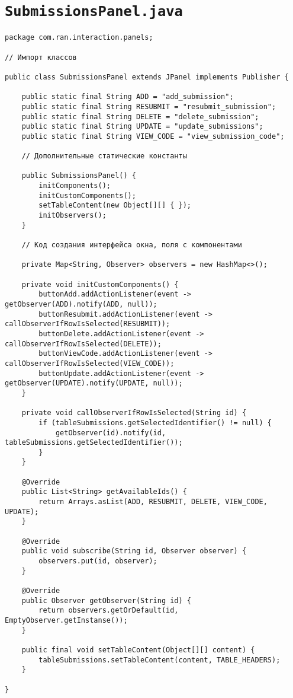 \section*{\texttt{SubmissionsPanel.java}}
\begin{verbatim}
package com.ran.interaction.panels;

// Импорт классов

public class SubmissionsPanel extends JPanel implements Publisher {

    public static final String ADD = "add_submission";
    public static final String RESUBMIT = "resubmit_submission";
    public static final String DELETE = "delete_submission";
    public static final String UPDATE = "update_submissions";
    public static final String VIEW_CODE = "view_submission_code";
    
    // Дополнительные статические константы
    
    public SubmissionsPanel() {
        initComponents();
        initCustomComponents();
        setTableContent(new Object[][] { });
        initObservers();
    }

    // Код создания интерфейса окна, поля с компонентами                     

    private Map<String, Observer> observers = new HashMap<>();
    
    private void initCustomComponents() {
        buttonAdd.addActionListener(event -> getObserver(ADD).notify(ADD, null));
        buttonResubmit.addActionListener(event -> callObserverIfRowIsSelected(RESUBMIT));
        buttonDelete.addActionListener(event -> callObserverIfRowIsSelected(DELETE));
        buttonViewCode.addActionListener(event -> callObserverIfRowIsSelected(VIEW_CODE));
        buttonUpdate.addActionListener(event -> getObserver(UPDATE).notify(UPDATE, null));
    }
    
    private void callObserverIfRowIsSelected(String id) {
        if (tableSubmissions.getSelectedIdentifier() != null) {
            getObserver(id).notify(id, tableSubmissions.getSelectedIdentifier());
        }
    }
    
    @Override
    public List<String> getAvailableIds() {
        return Arrays.asList(ADD, RESUBMIT, DELETE, VIEW_CODE, UPDATE);
    }
    
    @Override
    public void subscribe(String id, Observer observer) {
        observers.put(id, observer);
    }

    @Override
    public Observer getObserver(String id) {
        return observers.getOrDefault(id, EmptyObserver.getInstanse());
    }
    
    public final void setTableContent(Object[][] content) {
        tableSubmissions.setTableContent(content, TABLE_HEADERS);
    }
    
}
\end{verbatim}

